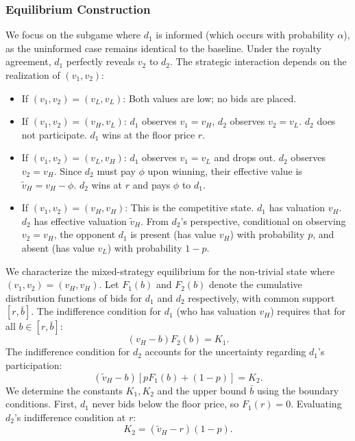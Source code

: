 \documentclass[11pt]{article}
\theoremstyle{plain}
\theoremstyle{definition}
\theoremstyle{plain}
\theoremstyle{plain}
\theoremstyle{plain}
\theoremstyle{plain}
\numberwithin{equation}{section}
\begin{document}
\subsubsection{Equilibrium Construction}

We focus on the subgame where $d_1$ is informed (which occurs with probability $\alpha$), as the uninformed case remains identical to the baseline. Under the royalty agreement, $d_1$ perfectly reveals $v_2$ to $d_2$.
The strategic interaction depends on the realization of $(v_1, v_2)$:
\begin{itemize}
    \item If $(v_1, v_2) = (v_L, v_L)$: Both values are low; no bids are placed.
    \item If $(v_1, v_2) = (v_H, v_L)$: $d_1$ observes $v_1=v_H$, $d_2$ observes $v_2=v_L$. $d_2$ does not participate. $d_1$ wins at the floor price $r$.
    \item If $(v_1, v_2) = (v_L, v_H)$: $d_1$ observes $v_1=v_L$ and drops out. $d_2$ observes $v_2=v_H$. Since $d_2$ must pay $\phi$ upon winning, their effective value is $\tilde{v}_H = v_H - \phi$. $d_2$ wins at $r$ and pays $\phi$ to $d_1$.
    \item If $(v_1, v_2) = (v_H, v_H)$: This is the competitive state. $d_1$ has valuation $v_H$. $d_2$ has effective valuation $\tilde{v}_H$. From $d_2$'s perspective, conditional on observing $v_2=v_H$, the opponent $d_1$ is present (has value $v_H$) with probability $p$, and absent (has value $v_L$) with probability $1-p$.
\end{itemize}
We characterize the mixed-strategy equilibrium for the non-trivial state where $(v_1, v_2) = (v_H, v_H)$. Let $F_1(b)$ and $F_2(b)$ denote the cumulative distribution functions of bids for $d_1$ and $d_2$ respectively, with common support $[r, \bar{b}]$. The indifference condition for $d_1$ (who has valuation $v_H$) requires that for all $b \in [r, \bar{b}]$:
\begin{equation*}
    (v_H - b) F_2(b) = K_1.
\end{equation*}
The indifference condition for $d_2$ accounts for the uncertainty regarding $d_1$'s participation:
\begin{equation*}
    (\tilde{v}_H - b) \left[ p F_1(b) + (1-p) \right] = K_2.
\end{equation*}
We determine the constants $K_1, K_2$ and the upper bound $\bar{b}$ using the boundary conditions.
First, $d_1$ never bids below the floor price, so $F_1(r) = 0$. Evaluating $d_2$'s indifference condition at $r$:
\begin{equation*}
    K_2 = (\tilde{v}_H - r)(1-p).
\end{equation*}
\end{document}
